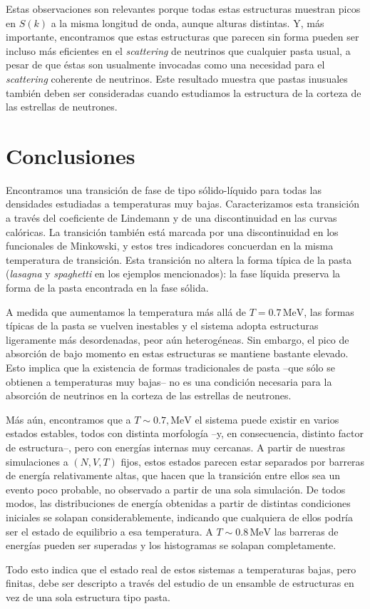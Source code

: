 Estas observaciones son relevantes porque todas estas estructuras muestran picos en $S(k)$ a la misma longitud de onda, aunque alturas distintas.
Y, más importante, encontramos que estas estructuras que parecen sin forma pueden ser incluso más eficientes en el \emph{scattering} de neutrinos que cualquier pasta usual, a pesar de que éstas son usualmente invocadas como una necesidad para el \emph{scattering} coherente de neutrinos.
Este resultado muestra que pastas inusuales también deben ser consideradas cuando estudiamos la estructura de la corteza de las estrellas de neutrones.

\section{Conclusiones}
\label{discussion}

Encontramos una transición de fase de tipo sólido-líquido para todas las densidades estudiadas a temperaturas muy bajas.
Caracterizamos esta transición a través del coeficiente de Lindemann y de una discontinuidad en las curvas calóricas.
La transición también está marcada por una discontinuidad en los funcionales de Minkowski, y estos tres indicadores concuerdan en la misma temperatura de transición.
Esta transición no altera la forma típica de la pasta (\emph{lasagna} y \emph{spaghetti}
en los ejemplos mencionados): la fase líquida preserva la forma de la pasta encontrada en la fase sólida.

A medida que aumentamos la temperatura más allá de $T=0.7\,\text{MeV}$, las formas típicas de la pasta se vuelven inestables y el sistema adopta estructuras ligeramente más desordenadas, peor aún heterogéneas.
Sin embargo, el pico de absorción de bajo momento en estas estructuras se mantiene bastante elevado.
Esto implica que la existencia de formas tradicionales de pasta --que sólo se obtienen a temperaturas muy bajas-- no es una condición necesaria para la absorción de neutrinos en la corteza de las estrellas de neutrones.

Más aún, encontramos que a $T\sim0.7,\text{MeV}$ el sistema puede existir en varios estados estables, todos con distinta morfología --y, en consecuencia, distinto factor de estructura--, pero con energías internas muy cercanas.
A partir de nuestras simulaciones a $(N,V,T)$ fijos, estos estados parecen estar separados por barreras de energía relativamente altas, que hacen que la transición entre ellos sea un evento poco probable, no observado a partir de una sola simulación.
De todos modos, las distribuciones de energía obtenidas a partir de distintas condiciones iniciales se solapan considerablemente, indicando que cualquiera de ellos podría ser el estado de equilibrio a esa temperatura.
A $T\sim0.8\,\text{MeV}$ las barreras de energías pueden ser superadas y los histogramas se solapan completamente.

Todo esto indica que el estado real de estos sistemas a temperaturas bajas, pero finitas, debe ser descripto a través del estudio de un ensamble de estructuras en vez de una sola estructura tipo pasta.
